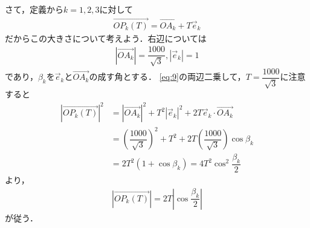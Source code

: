 \documentclass[../../main.tex]{subfiles}
\begin{document}
さて，定義から$k=1,2,3$に対して
\begin{align}
  \overrightarrow{OP_k(T)} = \overrightarrow{OA_k} + T \vec{e}_k \label{eq:9}
\end{align}
だからこの大きさについて考えよう．右辺については
\begin{align}
  |\overrightarrow{OA_k}| = \dfrac{1000}{\sqrt{3}}, |\vec{e}_k|=1
\end{align}
であり，$\beta_k$を$\vec{e}_k$と$\overrightarrow{OA_k}$の成す角とする．
\cref{eq:9}の両辺二乗して，$T=\dfrac{1000}{\sqrt{3}}$に注意すると
\begin{align}
  |\overrightarrow{OP_k(T)}|^2
  &= |\overrightarrow{OA_k}|^2 + T^2 |\vec{e}_k|^2 + 2T \vec{e}_k \cdot \overrightarrow{OA_k} \\
  &= \left(\dfrac{1000}{\sqrt{3}}\right)^2 + T^2 + 2T \left(\dfrac{1000}{\sqrt{3}}\right) \cos \beta_k \\
  &= 2T^2(1 + \cos \beta_k) = 4T^2 \cos^2 \dfrac{\beta_k}{2}
\end{align}
より，
\begin{align}
  |\overrightarrow{OP_k(T)}| = 2T \left|\cos \dfrac{\beta_k}{2}\right| \label{eq:10}
\end{align}
が従う．
\end{document}
